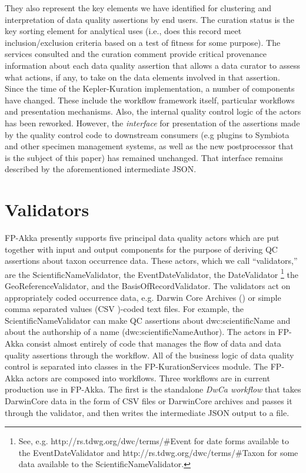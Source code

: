 \documentclass{article}
\begin{document}
They also represent the key elements we have identified for clustering and interpretation of data quality assertions by end users.  The curation status is the key sorting element for analytical uses (i.e., does this record meet inclusion/exclusion criteria based on a test of fitness for some purpose).  The services consulted and the curation comment provide critical provenance information about each data quality assertion that allows a data curator to assess what actions, if any, to take on the data elements involved in that assertion.  
Since the time of the Kepler-Kuration implementation, a number of components have changed. These include the workflow framework itself, particular workflows and presentation mechanisms. Also, the internal quality control logic of the actors has been reworked. However, the \emph{interface} for presentation of the assertions made by the quality control code to downstream consumers (e.g plugins to Symbiota and other specimen management systems, as well as the new postprocessor that is the subject of this paper) has remained unchanged. That interface remains described by the aforementioned intermediate JSON.

\section{Validators}
FP-Akka presently supports five principal data quality actors which are put together with input and output components for the purpose of deriving QC assertions about taxon occurrence data.  
These actors, which we call ``validators,'' are the ScientificNameValidator, the EventDateValidator, the DateValidator
\footnote{See, e.g. http://rs.tdwg.org/dwc/terms/\#Event for date forms available to the EventDateValidator and http://rs.tdwg.org/dwc/terms/\#Taxon for some data available to the ScientificNameValidator.}
 the GeoReferenceValidator, and the BasisOfRecordValidator.   
The validators act on appropriately coded occurrence data, e.g. Darwin Core Archives 
(\citep{robertson_dwca_2015}) 
 or simple comma separated values (CSV \citep{ietf4180})-coded text files.
For example, the ScientificNameValidator can make QC assertions about dwc:scientificName and about the authorship of a name (dwc:scientificNameAuthor).  The actors in FP-Akka consist almost entirely of code that manages the flow of data and data quality assertions through the workflow.  All of the business logic of data quality control is separated into classes in the FP-KurationServices module.   The FP-Akka actors are composed into workflows.  Three workflows are in current production use in FP-Akka. The first is the standalone \emph{DwCa workflow} that takes DarwinCore data in the form of CSV files or DarwinCore archives and passes it through 
the validator, and then writes the intermediate JSON output to a file. 
\end{document}
